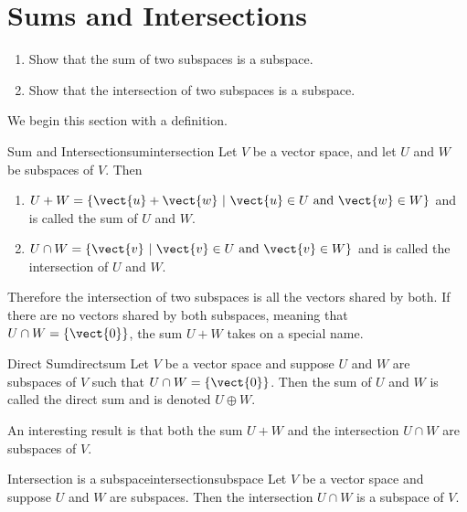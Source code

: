 \section{Sums and Intersections}

\begin{outcome}
\begin{enumerate}
\item[A.] Show that the sum of two subspaces is a subspace.

\item[B.] Show that the intersection of two subspaces is a subspace.
\end{enumerate}
\end{outcome}

We begin this section with a definition.

\begin{definition}{Sum and Intersection}{sumintersection}
Let $V$ be a vector space, and let $U$ and $W$ be subspaces of
$V$.  
Then
\begin{enumerate}
\item $U+W = \{ \vect{u}+\vect{w} ~|~ \vect{u}\in U\mbox{ and } \vect{w}\in W\}$ and is 
called the sum of $U$ and $W$.

\item $U\cap W = \{ \vect{v} ~|~ \vect{v}\in U\mbox{ and } \vect{v}\in W\}$ and is 
called the intersection of $U$ and $W$.
\end{enumerate}
\end{definition}

Therefore the intersection of two subspaces is all the vectors shared by both. If there are no vectors shared by both subspaces, meaning that $U \cap W = \left\{ \vect{0} \right\}$, the sum $U+W$ takes on a special name.

\begin{definition}{Direct Sum}{directsum}
Let $V$ be a vector space and suppose $U$ and $W$ are subspaces of $V$ such that  $U \cap W = \left\{ \vect{0} \right\}$. Then the sum of $U$ and $W$ is called the direct sum and is denoted $U \oplus W$. 
\end{definition}

An interesting result is that both the sum $U + W$ and the intersection $U \cap W$ are subspaces of $V$. 

\begin{example}{Intersection is a subspace}{intersectionsubspace}
Let $V$ be a vector space and suppose $U$ and $W$ are subspaces. Then the intersection $U \cap W$ is a subspace of $V$.
\end{example}

